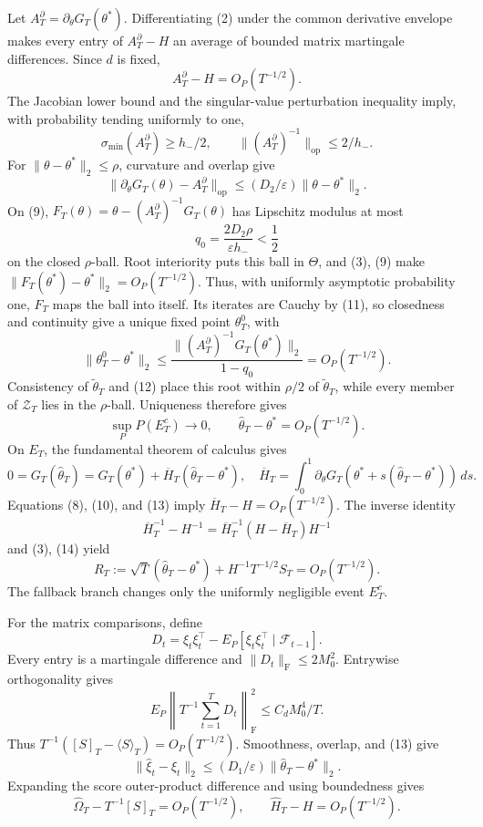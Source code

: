 Let \(A_T^\partial=\partial_\theta G_T(\theta^*)\).  Differentiating (2) under the common derivative envelope makes every entry of \(A_T^\partial-H\) an average of bounded matrix martingale differences.  Since \(d\) is fixed,
\[
 A_T^\partial-H=O_P(T^{-1/2}).
\tag{8}
\]
The Jacobian lower bound and the singular-value perturbation inequality imply, with probability tending uniformly to one,
\[
 \sigma_{\min}(A_T^\partial)\ge h_-/2,
 \qquad \|(A_T^\partial)^{-1}\|_{\mathrm{op}}\le2/h_-.
\tag{9}
\]
For \(\|\theta-\theta^*\|_2\le\rho\), curvature and overlap give
\[
 \|\partial_\theta G_T(\theta)-A_T^\partial\|_{\mathrm{op}}
 \le(D_2/\varepsilon)\|\theta-\theta^*\|_2.
\tag{10}
\]
On (9), \(F_T(\theta)=\theta-(A_T^\partial)^{-1}G_T(\theta)\) has Lipschitz modulus at most
\[
 q_0=\frac{2D_2\rho}{\varepsilon h_-}<\frac12
\tag{11}
\]
on the closed \(\rho\)-ball.  Root interiority puts this ball in \(\Theta\), and (3), (9) make \(\|F_T(\theta^*)-\theta^*\|_2=O_P(T^{-1/2})\).  Thus, with uniformly asymptotic probability one, \(F_T\) maps the ball into itself.  Its iterates are Cauchy by (11), so closedness and continuity give a unique fixed point \(\theta_T^0\), with
\[
 \|\theta_T^0-\theta^*\|_2
 \le\frac{\|(A_T^\partial)^{-1}G_T(\theta^*)\|_2}{1-q_0}
 =O_P(T^{-1/2}).
\tag{12}
\]
Consistency of \(\widetilde\theta_T\) and (12) place this root within \(\rho/2\) of \(\widetilde\theta_T\), while every member of \(\mathcal Z_T\) lies in the \(\rho\)-ball.  Uniqueness therefore gives
\[
 \sup_P P(E_T^c)\longrightarrow0,
 \qquad \widehat\theta_T-\theta^*=O_P(T^{-1/2}).
\tag{13}
\]
On \(E_T\), the fundamental theorem of calculus gives
\[
 0=G_T(\widehat\theta_T)=G_T(\theta^*)+\overline H_T
 (\widehat\theta_T-\theta^*),
 \quad
 \overline H_T=\int_0^1\partial_\theta G_T
 (\theta^*+s(\widehat\theta_T-\theta^*))\,ds.
\tag{14}
\]
Equations (8), (10), and (13) imply \(\overline H_T-H=O_P(T^{-1/2})\).  The inverse identity
\[
 \overline H_T^{-1}-H^{-1}
 =\overline H_T^{-1}(H-\overline H_T)H^{-1}
\tag{15}
\]
and (3), (14) yield
\[
 R_T:=\sqrt T(\widehat\theta_T-\theta^*)
 +H^{-1}T^{-1/2}S_T=O_P(T^{-1/2}).
\tag{16}
\]
The fallback branch changes only the uniformly negligible event \(E_T^c\).

For the matrix comparisons, define
\[
 D_t=\xi_t\xi_t^\top-E_P[\xi_t\xi_t^\top\mid\mathcal F_{t-1}].
\tag{17}
\]
Every entry is a martingale difference and \(\|D_t\|_{\mathrm F}\le2M_0^2\).  Entrywise orthogonality gives
\[
 E_P\left\|T^{-1}\sum_{t=1}^TD_t\right\|_{\mathrm F}^2
 \le C_dM_0^4/T.
\tag{18}
\]
Thus \(T^{-1}([S]_T-\langle S\rangle_T)=O_P(T^{-1/2})\).  Smoothness, overlap, and (13) give
\[
 \|\widehat\xi_t-\xi_t\|_2
 \le(D_1/\varepsilon)\|\widehat\theta_T-\theta^*\|_2.
\tag{19}
\]
Expanding the score outer-product difference and using boundedness gives
\[
 \widehat\Omega_T-T^{-1}[S]_T=O_P(T^{-1/2}),
 \qquad \widehat H_T-H=O_P(T^{-1/2}).
\tag{20}
\]

